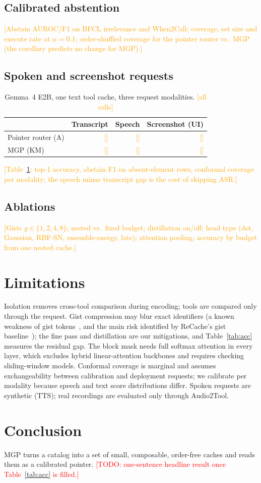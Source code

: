 \documentclass[sigconf,review,anonymous]{acmart}
\newcommand{\pending}[1]{\textcolor{orange}{[#1]}}
\newcommand{\todo}[1]{\textcolor{red}{[TODO: #1]}}
\newcommand{\method}{MGP}
\begin{document}
\subsection{Calibrated abstention}
\pending{Abstain AUROC/F1 on BFCL irrelevance and When2Call; coverage, set size and execute rate at $\alpha=0.1$; order-shuffled coverage for the pointer router vs.\ \method{} (the corollary predicts no change for \method{}).}

\subsection{Spoken and screenshot requests}
\begin{table}[t]
\caption{Gemma~4 E2B, one text tool cache, three request modalities. \pending{all cells}}
\label{tab:mm}
\begin{tabular}{lrrr}
\toprule
& Transcript & Speech & Screenshot (UI)\\
\midrule
Pointer router (A) & \pending{} & \pending{} & \pending{}\\
\method{} (KM) & \pending{} & \pending{} & \pending{}\\
\bottomrule
\end{tabular}
\end{table}
\pending{Table~\ref{tab:mm}: top-1 accuracy, abstain F1 on absent-element rows, conformal coverage per modality; the speech minus transcript gap is the cost of skipping ASR.}

\subsection{Ablations}
\pending{Gists $g\in\{1,2,4,8\}$; nested vs.\ fixed budget; distillation on/off; head type (dot, Gaussian, RBF-SN, ensemble-energy, late); attention pooling; accuracy by budget from one nested cache.}

\section{Limitations}
Isolation removes cross-tool comparison during encoding; tools are compared only through the request.
Gist compression may blur exact identifiers (a known weakness of gist tokens~\cite{deng2025giststudy}, and the main risk identified by ReCache's gist baseline~\cite{fang2026recache}); the fine pass and distillation are our mitigations, and Table~\ref{tab:acc} measures the residual gap.
The block mask needs full softmax attention in every layer, which excludes hybrid linear-attention backbones and requires checking sliding-window models.
Conformal coverage is marginal and assumes exchangeability between calibration and deployment requests; we calibrate per modality because speech and text score distributions differ.
Spoken requests are synthetic (TTS); real recordings are evaluated only through Audio2Tool.

\section{Conclusion}
\method{} turns a catalog into a set of small, composable, order-free caches and reads them as a calibrated pointer.
\todo{one-sentence headline result once Table~\ref{tab:acc} is filled.}



\end{document}
